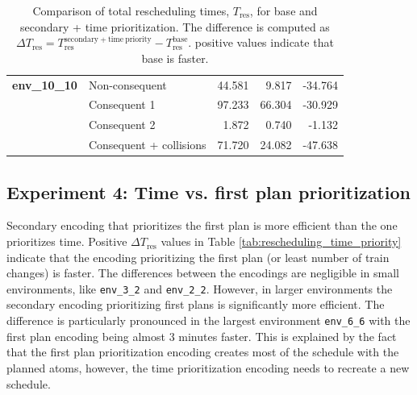 \documentclass[runningheads]{llncs}
\begin{document}
\begin{table}[htbp]
\begin{tabular}{@{}llrrr@{}}
		\midrule

		\textbf{env\_10\_10}
		& Non-consequent & 44.581 & 9.817 & -34.764 \\
		& Consequent 1 & 97.233 & 66.304 & -30.929 \\
		& Consequent 2 & 1.872 & 0.740 & -1.132 \\
		& Consequent + collisions & 71.720 & 24.082 & -47.638 \\
		
		\bottomrule
	\end{tabular}
	\vspace{4mm}
	\caption{Comparison of total rescheduling times, $T_{\mathrm{res}}$, for
		base and secondary + time prioritization. The difference is
		computed as
		$\Delta T_{\mathrm{res}} =
		T_{\mathrm{res}}^{\mathrm{secondary+time\ priority}} -
		T_{\mathrm{res}}^{\mathrm{base}}$.
		positive values indicate that base is faster.}
	\label{tab:rescheduling_time_prioritization}
\end{table}

\subsection{Experiment 4: Time vs. first plan prioritization}

Secondary encoding that prioritizes the first plan is more efficient than the one prioritizes time. 
Positive $\Delta T_{\mathrm{res}}$ values in Table \ref{tab:rescheduling_time_priority} indicate that the encoding prioritizing the first plan (or least number of train changes) is faster. 
The differences between the encodings are negligible in small environments, like \texttt{env\_3\_2} and \texttt{env\_2\_2}. 
However, in larger environments the secondary encoding prioritizing first plans is significantly more efficient. 
The difference is particularly pronounced in the largest environment \texttt{env\_6\_6} with the first plan encoding being almost 3 minutes faster.
This is explained by the fact that the first plan prioritization encoding creates most of the schedule with the planned atoms, however, 
the time prioritization encoding needs to recreate a new schedule.
\end{document}
